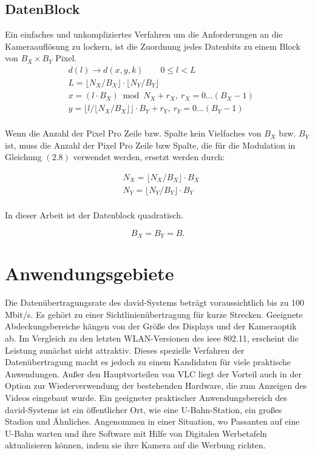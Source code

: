 \subsection{DatenBlock}

Ein einfaches und unkompliziertes Verfahren um die Anforderungen an die Kameraauflösung zu lockern, ist die Zuordnung jedes Datenbits zu einem Block von $B_X \times B_Y$ Pixel.
\begin{equation}
\begin{split}
  & d(l)\rightarrow d(x,y,k) \qquad 0\le l <L \\
  & L=\lfloor N_X/B_X \rfloor \cdot \lfloor N_Y/B_Y \rfloor \\
  & x=(l \cdot B_X) \bmod N_X +r_X, \ r_X =0...(B_X -1) \\
  & y=\lfloor l / \lfloor N_X/B_X \rfloor \rfloor \cdot B_Y +r_Y, \ r_Y =0...(B_Y -1) \\
\end{split}
\end{equation}

Wenn die Anzahl der Pixel Pro Zeile bzw. Spalte kein Vielfaches von $B_X$ bzw. $B_Y$ ist, muss die Anzahl der Pixel Pro Zeile bzw Spalte, die für die Modulation in Gleichung $\left(2.8\right)$ verwendet werden, ersetzt werden durch:

\begin{equation}
\begin{split}
  & N_X = \lfloor N_X/B_X \rfloor \cdot B_X\\ 
  & N_Y = \lfloor N_Y/B_Y \rfloor \cdot B_Y\\ 
\end{split}
\end{equation}

In dieser Arbeit ist der Datenblock quadratisch.

\begin{equation}
   B_X = B_Y = B.
\end{equation}


\section{Anwendungsgebiete} 

Die Datenübertragungsrate des \gls{david}-Systems beträgt voraussichtlich bis zu 100 Mbit/s. Es gehört zu einer Sichtlinienübertragung für kurze Strecken. Geeignete Abdeckungsbereiche hängen von der Größe des Displays und der Kameraoptik ab. Im Vergleich zu den letzten WLAN-Versionen des \gls{ieee} 802.11, erscheint die Leistung zunächst nicht attraktiv. Dieses spezielle Verfahren der Datenübertragung macht es jedoch zu einem Kandidaten für viele praktische Anwendungen. Außer den Hauptvorteilen von VLC liegt der Vorteil auch in der Option zur Wiederverwendung der bestehenden Hardware, die zum Anzeigen des Videos eingebaut wurde. Ein geeigneter praktischer Anwendungsbereich des \gls{david}-Systems ist ein öffentlicher Ort, wie eine U-Bahn-Station, ein großes Stadion und Ähnliches. Angenommen in einer Situation, wo Passanten auf eine U-Bahn warten und ihre Software mit Hilfe von Digitalen Werbetafeln aktualisieren können, indem sie ihre Kamera auf die Werbung richten.

